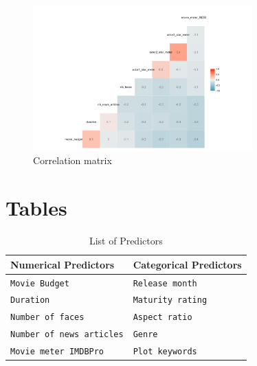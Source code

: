 \documentclass[12pt,a4paper]{article}
\begin{document}
\begin{appendices}
    \begin{figure}[h]
        \centering
        \includegraphics[width=0.75\textwidth]{corr_plot.png}
        \caption{Correlation matrix}
        \label{fig:correlation-matrix}
    \end{figure}

    \clearpage
    \section{Tables}\label{app:tables}

    \begin{table}[h]
        \centering
        \begin{tabular}{|l|l|}
            \hline
            \textbf{Numerical Predictors}    & \textbf{Categorical Predictors} \\
            \hline
            \texttt{Movie Budget}            & \texttt{Release month}          \\
            \texttt{Duration}                & \texttt{Maturity rating}        \\
            \texttt{Number of faces}         & \texttt{Aspect ratio}           \\
            \texttt{Number of news articles} & \texttt{Genre}                  \\
            \texttt{Movie meter IMDBPro}     & \texttt{Plot keywords}          \\
            \hline
        \end{tabular}
        \caption{List of Predictors}
        \label{tab:predictors}
    \end{table}


\end{appendices}
\end{document}

